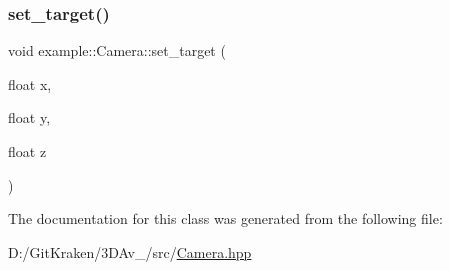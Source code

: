 \mbox{\label{classexample_1_1_camera_a79232d58b96672593124b28c5c1aafa3}} 
\subsubsection{\texorpdfstring{set\+\_\+target()}{set\_target()}}
{\footnotesize\ttfamily void example\+::\+Camera\+::set\+\_\+target (\begin{DoxyParamCaption}\item[{float}]{x,  }\item[{float}]{y,  }\item[{float}]{z }\end{DoxyParamCaption})\hspace{0.3cm}{\ttfamily [inline]}}



The documentation for this class was generated from the following file\+:\begin{DoxyCompactItemize}
\item 
D\+:/\+Git\+Kraken/3\+D\+Av\+\_/src/\mbox{\hyperlink{_camera_8hpp}{Camera.\+hpp}}\end{DoxyCompactItemize}
